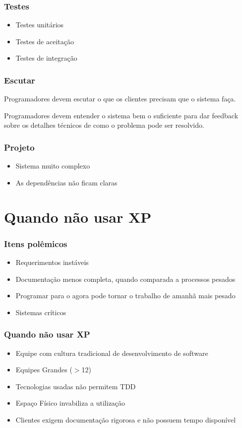 \documentclass[10pt]{beamer}
\begin{document}
\begin{frame}
  \frametitle{Testes}
  \begin{itemize}
  \item Testes unitários
  \item Testes de aceitação
  \item Testes de integração
  \end{itemize}
\end{frame}

\begin{frame}
  \frametitle{Escutar}
  Programadores devem escutar o que os clientes precisam que o sistema faça.

  \pause
  Programadores devem entender o sistema bem o suficiente para dar feedback
  sobre os detalhes técnicos de como o problema pode ser resolvido.
\end{frame}

\begin{frame}
  \frametitle{Projeto}
  \begin{itemize}
  \item Sistema muito complexo
  \item As dependências não ficam claras
  \end{itemize}
\end{frame}

\section{Quando não usar XP}


\begin{frame}
  \frametitle{Itens polêmicos}
  \begin{itemize}
  \item Requerimentos instáveis
  \item Documentação menos completa, quando comparada a processos pesados
  \item Programar para o agora pode tornar o trabalho de amanhã mais pesado
  \item Sistemas críticos
  \end{itemize}
\end{frame}


\begin{frame}
  \frametitle{Quando não usar XP}
  \begin{itemize}
  \item Equipe com cultura tradicional de desenvolvimento de software
  \item Equipes Grandes ($>$12)
  \item Tecnologias usadas não permitem TDD
  \item Espaço Físico invabiliza a utilização
  \item Clientes exigem documentação rigorosa e não possuem tempo disponível
  \end{itemize}
\end{frame}
\end{document}
